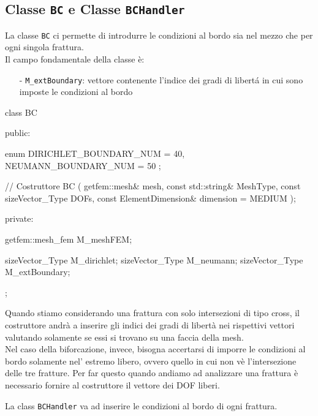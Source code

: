 \subsection{Classe \texttt{BC} e Classe \texttt{BCHandler}}
La classe \texttt{BC} ci permette di introdurre le condizioni al bordo sia nel mezzo che per ogni singola frattura. \\ 
Il campo fondamentale della classe \`{e}:
	\begin{enumerate}
	\item[-] \texttt{M\_extBoundary}: vettore contenente l'indice dei gradi di libert\'{a} in cui sono imposte le condizioni al bordo
	\end{enumerate} 

\begin{Code}[caption={Classe \texttt{BC}}]
class BC
{
 public:

    enum
    {
        DIRICHLET_BOUNDARY_NUM = 40,
        NEUMANN_BOUNDARY_NUM = 50
    };

    // Costruttore
    BC ( getfem::mesh& mesh,
         const std::string& MeshType,
         const sizeVector_Type DOFs,
         const ElementDimension& dimension = MEDIUM );

 private:

    getfem::mesh_fem M_meshFEM;
    
    sizeVector_Type M_dirichlet;
    sizeVector_Type M_neumann;
    sizeVector_Type M_extBoundary;   
};
\end{Code}

Quando stiamo considerando una frattura con solo intersezioni di tipo cross, il costruttore andrà a inserire gli indici dei gradi di libert\`{a} nei rispettivi vettori valutando solamente se essi si trovano su una faccia della mesh.\\
Nel caso della biforcazione, invece, bisogna accertarsi di imporre le condizioni al bordo solamente nel' estremo libero, ovvero quello in cui non v\`{e} l'intersezione delle tre fratture.
%
Per far questo quando andiamo ad analizzare una frattura \`{e} necessario fornire al costruttore il vettore dei DOF liberi.

La class \texttt{BCHandler} va ad inserire le condizioni al bordo di ogni frattura.

